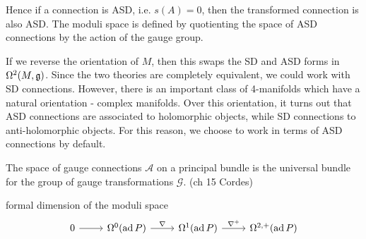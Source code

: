 Hence if a connection is ASD, i.e. $s(A)=0$, then the transformed connection is
also ASD. The moduli space is defined by quotienting the space of ASD
connections by the action of the gauge group. 


\begin{remark}
If we reverse the orientation of $M$, then this swaps the SD and ASD forms in
$\Omega^2(M,\operatorname{\mathfrak{g}})$. Since the two theories are completely
equivalent, we could work with SD connections. However, there is an
important class of 4-manifolds which have a natural orientation - complex
manifolds. Over this orientation, it turns out that ASD connections are 
associated to holomorphic objects, while SD connections to anti-holomorphic
objects.\cite[p.95]{morgan} For this reason, we choose to work in terms of 
ASD connections by default.
\end{remark}

The space of gauge connections $\mathcal{A}$ on a principal bundle is the
universal bundle for the group of gauge transformations $\mathcal{G}$. (ch 15
Cordes)


formal dimension of the moduli space
\[
\begin{tikzcd}
	0 \arrow[r] &\Omega^0(\ad P) \arrow[r,"\nabla"] 
				&\Omega^1(\ad P) \arrow[r,"\nabla^+"] &\Omega^{2,+}(\ad P)
\end{tikzcd} 
\] 


